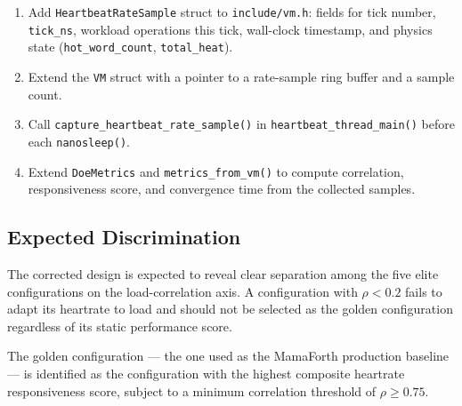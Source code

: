 \begin{enumerate}
  \item Add \texttt{HeartbeatRateSample} struct to \texttt{include/vm.h}:
        fields for tick number, \texttt{tick\_ns}, workload operations this
        tick, wall-clock timestamp, and physics state (\texttt{hot\_word\_count},
        \texttt{total\_heat}).
  \item Extend the \texttt{VM} struct with a pointer to a rate-sample ring
        buffer and a sample count.
  \item Call \texttt{capture\_heartbeat\_rate\_sample()} in
        \texttt{heartbeat\_thread\_main()} before each \texttt{nanosleep()}.
  \item Extend \texttt{DoeMetrics} and \texttt{metrics\_from\_vm()} to compute
        correlation, responsiveness score, and convergence time from the
        collected samples.
\end{enumerate}

\subsection{Expected Discrimination}

The corrected design is expected to reveal clear separation among the five
elite configurations on the load-correlation axis. A configuration with
$\rho < 0.2$ fails to adapt its heartrate to load and should not be selected
as the golden configuration regardless of its static performance score.

The golden configuration — the one used as the MamaForth production baseline
— is identified as the configuration with the highest composite heartrate
responsiveness score, subject to a minimum correlation threshold of
$\rho \geq 0.75$.


